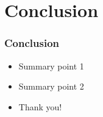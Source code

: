 \documentclass{beamer}
\begin{document}
\section{Conclusion}
\begin{frame}
\frametitle{Conclusion}
\begin{itemize}
    \item Summary point 1
    \item Summary point 2
    \item Thank you!
\end{itemize}
\end{frame}
\end{document}
